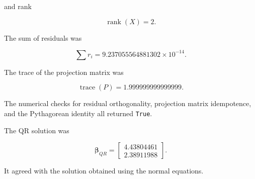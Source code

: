 \documentclass[12pt,a4paper]{article}
\numberwithin{equation}{section}
\begin{document}
and rank

\begin{equation}
\operatorname{rank}(X)=2.
\end{equation}

The sum of residuals was

\begin{equation}
\sum r_i
=9.237055564881302\times10^{-14}.
\end{equation}

The trace of the projection matrix was

\begin{equation}
\operatorname{trace}(P)=1.999999999999999.
\end{equation}

The numerical checks for residual orthogonality,
projection matrix idempotence, and the Pythagorean
identity all returned \texttt{True}.

The QR solution was

\begin{equation}
\boldsymbol{\beta}_{QR}
=
\begin{bmatrix}
4.43804461\\
2.38911988
\end{bmatrix}.
\end{equation}

It agreed with the solution obtained using
the normal equations.
\end{document}
